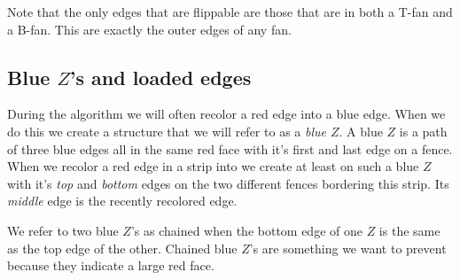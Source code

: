 Note that the only edges that are flippable are those that are in both a T-fan and a B-fan. This are exactly the outer edges of any fan.


\subsection{Blue $Z$'s and loaded edges}
  During the algorithm we will often recolor a red edge into a blue edge. When we do this we create a structure that we will refer to as a \emph{blue $Z$}. A blue $Z$ is a path of three blue edges all in the same red face with it's first and last edge on a fence.
  When we recolor a red edge in a strip into we create at least on such a blue $Z$ with it's \emph{top} and \emph{bottom} edges on the two different fences bordering this strip. Its \emph{middle} edge is the recently recolored edge.

  We refer to two blue $Z$'s as chained when the bottom edge of one $Z$  is the same as the top edge of the other. Chained blue $Z$'s are something we want to prevent because they indicate a large red face.

